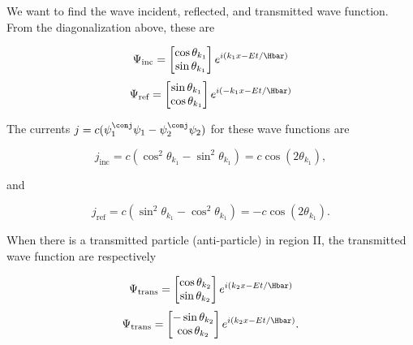 We want to find the wave incident, reflected, and transmitted wave function.  From the diagonalization above, these are

\begin{dmath}\label{eqn:gradQuantumProblemSet4Problem3:640}
\Psi_{\textrm{inc}} =
\begin{bmatrix}
\cos\theta_{k_1} \\
\sin\theta_{k_1} \\
\end{bmatrix}
e^{i (k_1 x - E t/\Hbar)}
\end{dmath}
\begin{dmath}\label{eqn:gradQuantumProblemSet4Problem3:660}
\Psi_{\textrm{ref}} =
\begin{bmatrix}
\sin\theta_{k_1} \\
\cos\theta_{k_1} \\
\end{bmatrix}
e^{i (-k_1 x - E t/\Hbar)}
\end{dmath}

The currents \( j = c (\psi_1^\conj \psi_1 - \psi_2^\conj \psi_2) \) for these wave functions are

\begin{equation}\label{eqn:gradQuantumProblemSet4Problem3:960}
j_{\textrm{inc}} = c (\cos^2 \theta_{k_1} - \sin^2 \theta_{k_1}) = c \cos(2 \theta_{k_1} ),
\end{equation}

and

\begin{equation}\label{eqn:gradQuantumProblemSet4Problem3:980}
j_{\textrm{ref}} = c (\sin^2 \theta_{k_1} - \cos^2 \theta_{k_1}) = -c \cos(2 \theta_{k_1} ).
\end{equation}

When there is a transmitted particle (anti-particle) in region II, the transmitted wave function are respectively

\begin{dmath}\label{eqn:gradQuantumProblemSet4Problem3:680}
\Psi_{\textrm{trans}} =
\begin{bmatrix}
\cos\theta_{k_2} \\
\sin\theta_{k_2} \\
\end{bmatrix}
e^{i (k_2 x - E t/\Hbar)}
\end{dmath}
\begin{dmath}\label{eqn:gradQuantumProblemSet4Problem3:700}
\Psi_{\textrm{trans}} =
\begin{bmatrix}
-\sin\theta_{k_2} \\
\cos\theta_{k_2} \\
\end{bmatrix}
e^{i (k_2 x - E t/\Hbar)}.
\end{dmath}

